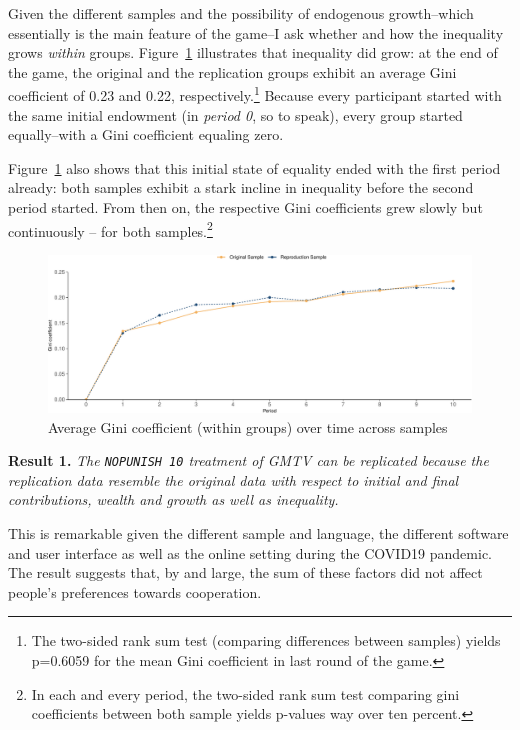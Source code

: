 \documentclass[
  authoryear,
  preprint,
  3p]{elsarticle}
\begin{document}
Given the different samples and the possibility of endogenous
growth--which essentially is the main feature of the game--I ask whether
and how the inequality grows \emph{within} groups.
Figure~\ref{fig-gini-time-series} illustrates that inequality did grow:
at the end of the game, the original and the replication groups exhibit
an average Gini coefficient of 0.23 and 0.22, respectively.\footnote{The
  two-sided rank sum test (comparing differences between samples) yields
  p=0.6059 for the mean Gini coefficient in last round of the game.}
Because every participant started with the same initial endowment (in
\emph{period 0}, so to speak), every group started equally--with a Gini
coefficient equaling zero.

Figure~\ref{fig-gini-time-series} also shows that this initial state of
equality ended with the first period already: both samples exhibit a
stark incline in inequality before the second period started. From then
on, the respective Gini coefficients grew slowly but continuously -- for
both samples.\footnote{In each and every period, the two-sided rank sum
  test comparing gini coefficients between both sample yields p-values
  way over ten percent.}

\begin{figure}

{\centering \includegraphics{paper_files/figure-pdf/fig-gini-time-series-1.pdf}

}

\caption{\label{fig-gini-time-series}Average Gini coefficient (within
groups) over time across samples}

\end{figure}

\textbf{Result 1.} \emph{The \texttt{NOPUNISH\ 10} treatment of GMTV can
be replicated because the replication data resemble the original data
with respect to initial and final contributions, wealth and growth as
well as inequality.}

This is remarkable given the different sample and language, the
different software and user interface as well as the online setting
during the COVID19 pandemic. The result suggests that, by and large, the
sum of these factors did not affect people's preferences towards
cooperation.
\end{document}
